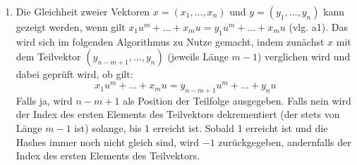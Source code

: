 \documentclass[a4paper,10pt]{scrartcl}
\begin{document}
\begin{enumerate}
\begin{enumerate}
                Damit ist bewiesen:
                \[(x_1, ..., x_n) \lex{<} (y_1, ..., y_n) 
                        \Leftrightarrow \sum\limits_{i=1}^{n} x_{i}u^{n-i+1} < \sum\limits_{i=1}^{n} y_{i}u^{n-i+1} \]
	\end{enumerate}
\item  Die Gleichheit zweier Vektoren $x = (x_1, ..., x_n)$ und $y = (y_1, ..., y_n)$ kann gezeigt werden,  wenn gilt
         $x_1 u^m  + ... + x_m u = y_1 u^m + ... + x_m u$ (vlg. a1). Das wird sich im folgenden Algorithmus zu Nutze gemacht, indem zunächst $x$ mit dem Teilvektor $(y_{n-m+1}, ..., y_n)$ (jeweils Länge $m-1$) verglichen wird und dabei geprüft wird, ob gilt: 
         \[x_1 u^m + ... + x_m u = y_{n-m+1} u^m + ... + y_n u\]
         Falls ja, wird $n-m+1$ als Position der Teilfolge ausgegeben. Falls nein wird der Index des ersten Elements des Teilvektors dekrementiert (der stets von Länge $m-1$ ist) solange, bis 1 erreicht ist. Sobald 1 erreicht ist und die Hashes immer noch nicht gleich sind, wird $-1$ zurückgegeben, andernfalls der Index des ersten Elements des Teilvektors.


\end{enumerate}
\end{document}
